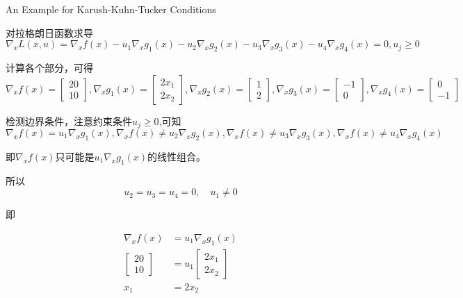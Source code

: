\begin{FigureCenter}{An Example for Karush-Kuhn-Tucker Conditions}
    
\end{FigureCenter}


对拉格朗日函数求导
\begin{equation} \nabla_{x} L(x, u)=\nabla_{x} f(x)-u_{1} \nabla_{x} g_{1}(x)-u_{2} \nabla_{x} g_{2}(x)-u_{3} \nabla_{x} g_{3}(x)-u_{4} \nabla_{x} g_{4}(x)=0, u_{j} \geq 0 \end{equation}

计算各个部分，可得
\begin{equation} \nabla_{x} f(x)=\left[\begin{array}{c}20 \\ 10\end{array}\right], \nabla_{x} g_{1}(x)=\left[\begin{array}{c}2 x_{1} \\ 2 x_{2}\end{array}\right], \nabla_{x} g_{2}(x)=\left[\begin{array}{l}1 \\ 2\end{array}\right], \nabla_{x} g_{3}(x)=\left[\begin{array}{l}-1 \\ 0\end{array}\right], \nabla_{x} g_{4}(x)=\left[\begin{array}{l}0 \\ -1\end{array}\right]\end{equation}

检测边界条件，注意约束条件$u_{j} \geq 0$,可知
\begin{equation} \nabla_{x} f(x)=u_{1} \nabla_{x} g_{1}(x), \nabla_{x} f(x) \neq u_{2} \nabla_{x} g_{2}(x), \nabla_{x} f(x) \neq u_{3} \nabla_{x} g_{3}(x), \nabla_{x} f(x) \neq u_{4} \nabla_{x} g_{4}(x) \end{equation}

即$\nabla_{x} f(x)$只可能是$u_{1} \nabla_{x} g_{1}(x)$的线性组合。

所以
\begin{equation} u_{2}=u_{3}=u_{4}=0, \quad u_{1} \neq 0 \end{equation}

即

\begin{equation}
\begin{aligned}
    \nabla_{x} f(x)&=u_{1} \nabla_{x} g_{1}(x)\\
\left[\begin{array}{c}
20 \\
10
\end{array}\right]&=u_{1}\left[\begin{array}{c}
2 x_{1} \\
2 x_{2}
\end{array}\right]\\
x_{1}&=2 x_{2} 
\end{aligned}
\end{equation}

